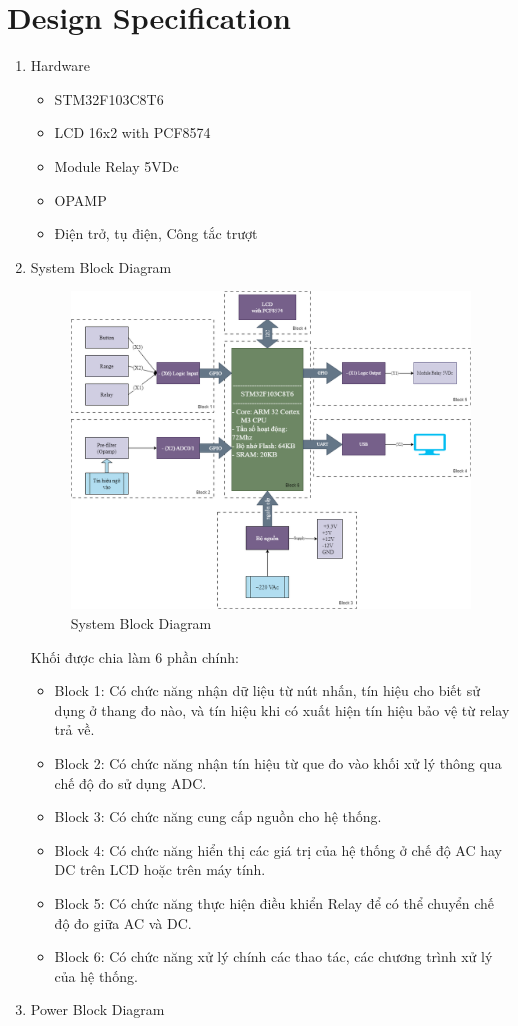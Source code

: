\section{Design Specification}
\begin{enumerate}[label=\alph*) ]
	\item Hardware
	\begin{itemize}[label=+]
		\item STM32F103C8T6
		\item LCD 16x2 with PCF8574
		\item Module Relay 5VDc
		\item OPAMP
		\item Điện trở, tụ điện, Công tắc trượt
	\end{itemize}
	\item System Block Diagram
	
	\begin{figure}[H]
		\includegraphics[width=\linewidth]{picture/system_block.png}
		\caption{System Block Diagram}
		\label{t_system block diagram}
	\end{figure}
	
	Khối được chia làm 6 phần chính:
	
	\begin{itemize}[label=-]
		\item Block 1: Có chức năng nhận dữ liệu từ nút nhấn, tín hiệu cho biết sử dụng ở thang đo nào, và tín hiệu khi có xuất hiện tín hiệu bảo vệ từ relay trả về.
		\item Block 2: Có chức năng nhận tín hiệu từ que đo vào khối xử lý thông qua chế độ đo sử dụng ADC.
		\item Block 3: Có chức năng cung cấp nguồn cho hệ thống.
		\item Block 4: Có chức năng hiển thị các giá trị của hệ thống ở chế độ AC hay DC trên LCD hoặc trên máy tính.
		\item Block 5: Có chức năng thực hiện điều khiển Relay để có thể chuyển chế độ đo giữa AC và DC.
		\item Block 6: Có chức năng xử lý chính các thao tác, các chương trình xử lý của hệ thống.
	\end{itemize}
	\item Power Block Diagram
	

\end{enumerate}
